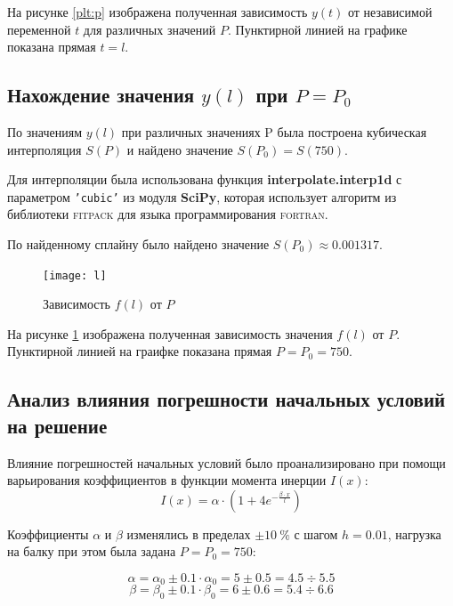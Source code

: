 На рисунке \ref{plt:p} изображена полученная зависимость $y(t)$ от независимой переменной $t$ для различных значений $P$. Пунктирной линией на графике показана прямая $t = l$.

\subsection{Нахождение значения $y(l)$ при $P = P_0$}

По значениям $y(l)$ при различных значениях P была построена кубическая интерполяция $S(P)$ и найдено значение $S(P_0) = S(750)$.

Для интерполяции была использована функция \textbf{interpolate.interp1d} с параметром \texttt{'cubic'} из модуля \textbf{SciPy}, которая использует алгоритм из библиотеки \textsc{fitpack} для языка программирования \textsc{fortran}.

По найденному сплайну было найдено значение $S(P_0) \approx 0.001317$.

\begin{figure}[H]
\begin{center}
	\vspace{-0.5cm}
	\texttt{[image: l]}
	\caption{Зависимость $f(l)$ от $P$}
	\label{plt:l}
	\vspace{-0.5cm}
\end{center}
\end{figure}

На рисунке \ref{plt:l} изображена полученная зависимость значения $f(l)$ от $P$. Пунктирной линией на граифке показана прямая $P = P_0 = 750$.

\subsection{Анализ влияния погрешности начальных условий на решение}

Влияние погрешностей начальных условий было проанализировано при помощи варьирования коэффициентов в функции момента инерции $I(x)$:
\begin{equation}\label{eq:var}
I(x) = \alpha \cdot(1 + 4e^{-\frac{\beta\cdot x}{l}})
\end{equation}

Коэффициенты $\alpha$ и $\beta$ изменялись в пределах $\pm 10\ \%$ с шагом $h = 0.01$, нагрузка на балку при этом была задана $P = P_0 = 750$:
\begin{multicols}{2}
\noindent
\[
	\alpha = \alpha_0 \pm 0.1\cdot \alpha_0 = 5 \pm 0.5 = 4.5 \div 5.5
\]
\[
	\beta = \beta_0 \pm 0.1\cdot \beta_0 = 6 \pm 0.6 = 5.4 \div 6.6
\]
\end{multicols}

